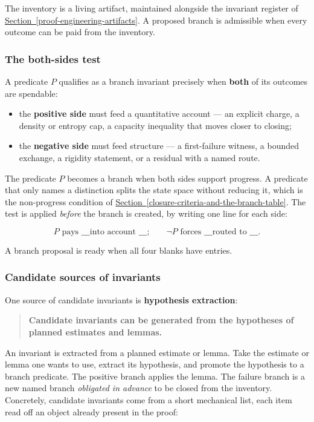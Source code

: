 \documentclass[
  11pt,
]{article}
\providecommand{\tightlist}{%
  \setlength{\itemsep}{0pt}\setlength{\parskip}{0pt}}
\theoremstyle{definition}
\newcommand{\secref}[1]{\hyperref[#1]{Section~\ref*{#1}}}
\begin{document}
The inventory is a living artifact, maintained alongside the invariant
register of \secref{proof-engineering-artifacts}. A proposed branch is admissible when every
outcome can be paid from the inventory.

\subsubsection{The both-sides test}\label{the-both-sides-test}

A predicate \(P\) qualifies as a branch invariant precisely when
\textbf{both} of its outcomes are spendable:

\begin{itemize}
\tightlist
\item
  the \textbf{positive side} must feed a quantitative account --- an
  explicit charge, a density or entropy cap, a capacity inequality that
  moves closer to closing;
\item
  the \textbf{negative side} must feed structure --- a first-failure
  witness, a bounded exchange, a rigidity statement, or a residual with
  a named route.
\end{itemize}

The predicate \(P\) becomes a branch when both sides support progress. A
predicate that only names a distinction splits the state space without
reducing it, which is the non-progress condition of \secref{closure-criteria-and-the-branch-table}. The test
is applied \emph{before} the branch is created, by writing one line for
each side:

\[
P \text{ pays \_\_\_ into account \_\_\_;}
\qquad
\neg P \text{ forces \_\_\_ routed to \_\_\_.}
\]

A branch proposal is ready when all four blanks have entries.



\subsubsection{Candidate sources of
invariants}\label{mechanical-sources-of-invariants}

One source of candidate invariants is \textbf{hypothesis extraction}:

\begin{quote}
\textbf{Candidate invariants can be generated from the hypotheses of
planned estimates and lemmas.}
\end{quote}

An invariant is extracted from a planned estimate or lemma. Take the
estimate or lemma one wants to use, extract its hypothesis, and promote
the hypothesis to a branch predicate. The positive branch applies the
lemma. The failure branch is a new named branch \emph{obligated in
advance} to be closed from the inventory. Concretely, candidate
invariants come from a short mechanical list, each item read off an
object already present in the proof:
\end{document}
